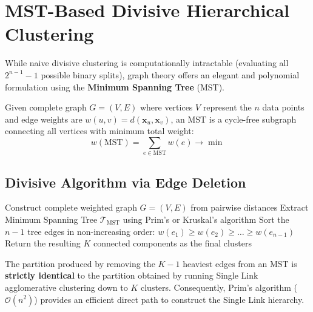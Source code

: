 \section{MST-Based Divisive Hierarchical Clustering}
\label{sec:dm-divisive-mst-clustering}

While naive divisive clustering is computationally intractable (evaluating all $2^{n-1} - 1$ possible binary splits), graph theory offers an elegant and polynomial formulation using the \textbf{Minimum Spanning Tree} ($\mathrm{MST}$).

\begin{definition}
Given complete graph $G = (V, E)$ where vertices $V$ represent the $n$ data points and edge weights are $w(u, v) = d(\mathbf{x}_u, \mathbf{x}_v)$, an $\mathrm{MST}$ is a cycle-free subgraph connecting all vertices with minimum total weight:
\begin{equation}
    w(\mathrm{MST}) = \sum_{e \in \mathrm{MST}} w(e) \to \min
\end{equation}
\end{definition}

\subsection{Divisive Algorithm via Edge Deletion}

\begin{algorithm}[htbp]
\SetAlgoLined
{}
Construct complete weighted graph $G = (V, E)$ from pairwise distances\;
Extract Minimum Spanning Tree $\mathcal{T}_{\mathrm{MST}}$ using Prim's or Kruskal's algorithm\;
Sort the $n - 1$ tree edges in non-increasing order: $w(e_1) \ge w(e_2) \ge \dots \ge w(e_{n-1})$\;
Return the resulting $K$ connected components as the final clusters\;
\caption{Divisive clustering based on Minimum Spanning Tree.}
\label{alg:dm-divisive-mst-en}
\end{algorithm}

\begin{property}
The partition produced by removing the $K - 1$ heaviest edges from an $\mathrm{MST}$ is \textbf{strictly identical} to the partition obtained by running Single Link agglomerative clustering down to $K$ clusters. Consequently, Prim's algorithm ($\mathcal{O}(n^2)$) provides an efficient direct path to construct the Single Link hierarchy.
\end{property}

